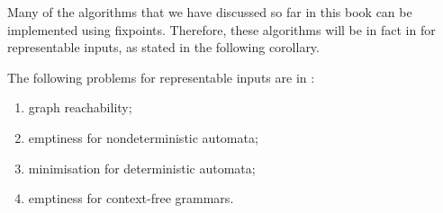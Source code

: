 Many of the algorithms that we have discussed so far in this book can be implemented using fixpoints. Therefore, these algorithms will be in fact in  \fdp for representable inputs, as stated in the following corollary.

\begin{corollary}\label{cor:examples-of-fdp}
 The following problems for representable inputs are in  \fdp:
 \begin{enumerate}
 \item graph reachability;
 \item emptiness for nondeterministic automata;
 \item minimisation for deterministic automata;
 \item emptiness for context-free grammars.
 \end{enumerate}
\end{corollary} 
